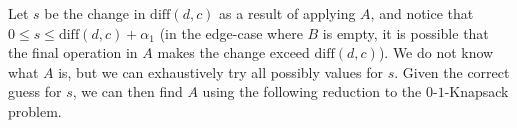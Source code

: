 \documentclass[letterpaper]{article} %
\newtheorem{lemma}{Lemma}
\newcommand{\diff}{\mathrm{diff}}
\begin{document}





Let $s$ be the change in $\diff(d,c)$ as a result of applying $A$, and notice that $0 \leq s \leq \diff(d,c) + \alpha_1 $ (in the edge-case where $B$ is empty, it is possible that the final operation in $A$ makes the change exceed $\diff(d,c)$). We do not know what $A$ is, but  we can exhaustively try all possibly values for $s$. Given the correct guess for $s$, we can then find $A$ using the following reduction to the $0$-$1$-Knapsack problem.
\end{document}
